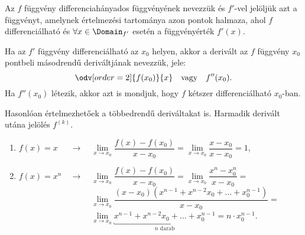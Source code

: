 \begin{definition}
  Az $f$ függvény differenciahányados függvényének nevezzük és $f'$-vel
  jelöljük azt a függvényt, amelynek értelmezési tartománya azon pontok
  halmaza, ahol $f$ differenciálható és $\forall x \in \Domain_{f'}$ esetén
  a függvényérték $f'(x)$.
\end{definition}

\begin{definition}
  Ha az $f'$ függvény differenciálható az $x_0$ helyen, akkor a derivált az
  $f$ függvény $x_0$ pontbeli másodrendű deriváltjának nevezzük, jele:
  \[
    \odv[order = 2]{f(x_0)}{x}
    \quad\text{vagy}\quad
    f''(x_0)
    \text.
  \]
  Ha $f''(x_0)$ létezik, akkor azt is mondjuk, hogy $f$ kétszer differenciálható
  $x_0$-ban.
\end{definition}

\begin{note}
  Hasonlóan értelmezhetőek a többedrendű deriváltakat is. Harmadik derivált
  utána jelölés $f^{(k)}$.
\end{note}

\begin{example}
  \begin{enumerate}
    \item $f(x) = x
            \phantom{cx^n}\rightarrow\quad
            \lim\limits_{x \rightarrow x_0} \dfrac{f(x)-f(x_0)}{x-x_0} =
            \lim\limits_{x \rightarrow x_0} \dfrac{x-x_0}{x-x_0} = 1$,
    \item $f(x) = x^n
            \phantom{cx}\rightarrow\quad
            \lim\limits_{x \rightarrow x_0} \dfrac{f(x)-f(x_0)}{x-x_0} =
            \lim\limits_{x \rightarrow x_0} \dfrac{x^n-x_0^n}{x-x_0} =$\\
          $\phantom{f(x) = cxx^n\rightarrow\quad}
            \lim\limits_{x \rightarrow x_0}
            \dfrac{(x-x_0)(x^{n-1}+x^{n-2}x_0+\ldots+x_0^{n-1})}{x-x_0} =$\\
          $\phantom{f(x) = cxx^n\rightarrow\quad}
            \lim\limits_{x \rightarrow x_0}
            \underbracket{x^{n-1}+x^{n-2}x_0+\ldots+x_0^{n-1}}_{n\text{ darab}} =
            n\cdot x_0^{n-1}$.

  \end{enumerate}
\end{example}

